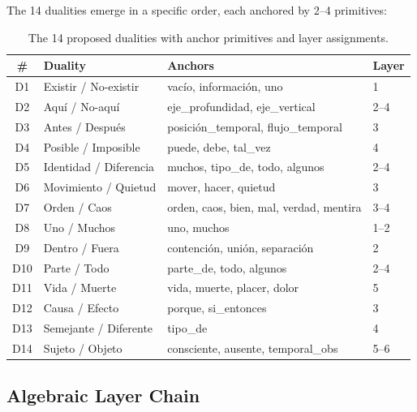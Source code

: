 \documentclass[11pt, a4paper]{article}
\begin{document}
The 14 dualities emerge in a specific order, each anchored by 2--4 primitives:

\begin{table}[ht]
\centering
\small
\begin{tabular}{clll}
\toprule
\textbf{\#} & \textbf{Duality} & \textbf{Anchors} & \textbf{Layer} \\
\midrule
D1  & Existir / No-existir     & vac\'{i}o, informaci\'{o}n, uno           & 1 \\
D2  & Aqu\'{i} / No-aqu\'{i}  & eje\_profundidad, eje\_vertical            & 2--4 \\
D3  & Antes / Despu\'{e}s     & posici\'{o}n\_temporal, flujo\_temporal    & 3 \\
D4  & Posible / Imposible      & puede, debe, tal\_vez                     & 4 \\
D5  & Identidad / Diferencia   & muchos, tipo\_de, todo, algunos           & 2--4 \\
D6  & Movimiento / Quietud     & mover, hacer, quietud                     & 3 \\
D7  & Orden / Caos             & orden, caos, bien, mal, verdad, mentira   & 3--4 \\
D8  & Uno / Muchos             & uno, muchos                               & 1--2 \\
D9  & Dentro / Fuera           & contenci\'{o}n, uni\'{o}n, separaci\'{o}n & 2 \\
D10 & Parte / Todo             & parte\_de, todo, algunos                  & 2--4 \\
D11 & Vida / Muerte            & vida, muerte, placer, dolor               & 5 \\
D12 & Causa / Efecto           & porque, si\_entonces                      & 3 \\
D13 & Semejante / Diferente    & tipo\_de                                  & 4 \\
D14 & Sujeto / Objeto          & consciente, ausente, temporal\_obs         & 5--6 \\
\bottomrule
\end{tabular}
\caption{The 14 proposed dualities with anchor primitives and layer assignments.}
\label{tab:dualities}
\end{table}

\subsection{Algebraic Layer Chain}
\end{document}
